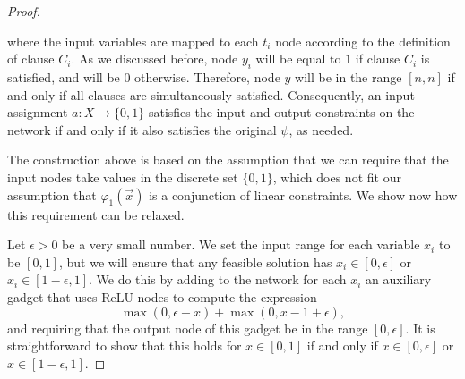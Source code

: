 \documentclass[a4paper]{llncs}
\begin{document}
\begin{proof}
\begin{figure}[H]
\end{figure}
\noindent
where the input variables are mapped to each $t_i$ node  according to the
definition of clause $C_i$.
 As we discussed before, node $y_i$ will be equal
to $1$ if clause $C_i$ is satisfied, and will be $0$ otherwise.
Therefore, node $y$ will be in the range
$[n,n]$  if and only if all clauses are simultaneously
satisfied.
 Consequently, an input assignment $a:X\rightarrow\{0,1\}$
satisfies the input and output constraints on the network if and only if it also satisfies the original
$\psi$, as needed.

The construction above is based on the assumption that we can require
that the input nodes take values in the discrete set $\{0,1\}$, which
does not fit our assumption that $\varphi_1(\vec{x})$ is a
conjunction of linear constraints. We show now how this requirement
can be relaxed.

Let $\epsilon>0$ be a very small number.
We set the
input range for each variable $x_i$ to be $[0,1]$, but we will ensure that
any feasible solution has $x_i\in[0,\epsilon]$ or $x_i\in[1-\epsilon,
1]$. We do this by adding to the network for each $x_i$ an auxiliary
gadget that uses ReLU nodes to compute the expression
\[
\max{}(0, \epsilon - x) + \max{}(0, x - 1 + \epsilon),
\]
and requiring that the output node of this gadget be in the range $[0, \epsilon]$. 
It is straightforward to show that this holds for $x\in [0,1]$ if and
only if $x\in[0,\epsilon]$ or $x\in[1-\epsilon,1]$.


\end{proof}
\end{document}
